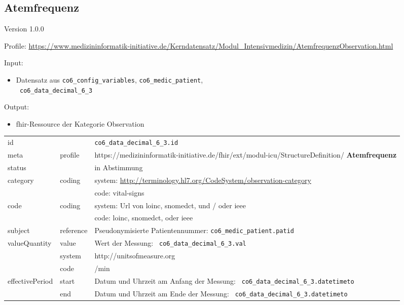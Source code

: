\subsection{Atemfrequenz} 
\noindent Version 1.0.0

\noindent Profile: \url{https://www.medizininformatik-initiative.de/Kerndatensatz/Modul_Intensivmedizin/AtemfrequenzObservation.html}

\noindent Input:
\begin{itemize}
	\item Datensatz aus \texttt{co6\_config\_variables}, \texttt{co6\_medic\_patient}, \\ \texttt{
co6\_data\_decimal\_6\_3}
\end{itemize}
Output:
\begin{itemize}
        \item \ac{fhir}-Ressource der Kategorie \glqq Observation\grqq{}
\end{itemize}
\begin{longtable}{|l|l|p{7.5cm}|}
        \hline
        \rowcolor{lightgray} \multicolumn{3}{|l|}{Data Mapping (inhaltlich)} \\ \hline
        id &  & \texttt{co6\_data\_decimal\_6\_3.id} \\ \hline
	meta & profile & https://medizininformatik-initiative.de/fhir/ext/modul-icu/StructureDefinition/\textbf{
Atemfrequenz} \\ \hline 
	status &  & in Abstimmung  \\ \hline 
	category & coding & system: \url{http://terminology.hl7.org/CodeSystem/observation-category} \\
\cline{3-3}
	& & code: vital-signs\\ \hline
	code & coding & system: Url von \ac{loinc}, \ac{snomedct}, und / oder \ac{ieee} \\ 
	\cline{3-3} 
	 &  & code: \ac{loinc}, \ac{snomedct}, oder \ac{ieee} \\ \hline
	subject & reference & Pseudonymisierte Patientennummer: \texttt{co6\_medic\_patient.patid} \\ \hline
	valueQuantity & value & Wert der Messung: \texttt{
co6\_data\_decimal\_6\_3.val} \\
        \cline{2-3}
         & system & http://unitsofmeasure.org \\
         \cline{2-3}
         & code & /min
\\ \hline
    effectivePeriod & start & Datum und Uhrzeit am Anfang der Messung: \texttt{
co6\_data\_decimal\_6\_3.datetimeto} \\
    \cline{2-3}
     & end & Datum und Uhrzeit am Ende der Messung: \texttt{
co6\_data\_decimal\_6\_3.datetimeto} \\ \hline
\end{longtable}


